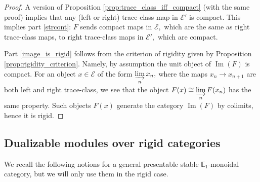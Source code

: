 \documentclass[11pt,leqno]{amsart}
\numberwithin{equation}{section}
\newcommand{\indlim}[1][]{\mathop{\varinjlim}\limits_{#1}}
\newcommand{\bE}{{\mathbb E}}
\newcommand{\cE}{{\mathcal E}}
\newcommand{\im}{\operatorname{Im}}
\begin{document}
\begin{proof}
A version of Proposition \ref{prop:trace_class_iff_compact} (with the same proof) implies that any (left or right) trace-class map in $\cE'$ is compact. This implies part \ref{strcont}: $F$ sends compact maps in $\cE,$ which are the same as right trace-class maps, to right trace-class maps in $\cE',$ which are compact.

Part \ref{image_is_rigid} follows from the criterion of rigidity given by Proposition \ref{prop:rigidity_criterion}. Namely, by assumption the unit object of $\im(F)$ is compact. For an object $x\in\cE$ of the form $\indlim[n]x_n,$ where the maps $x_n\to x_{n+1}$ are both left and right trace-class, we see that the object $F(x)\cong\indlim[n]F(x_n)$ has the same property. Such objects $F(x)$ generate the category $\im(F)$ by colimits, hence it is rigid.  
\end{proof}

\subsection{Dualizable modules over rigid categories}

We recall the following notions for a general presentable stable $\bE_1$-monoidal category, but we will only use them in the rigid case.
\end{document}

